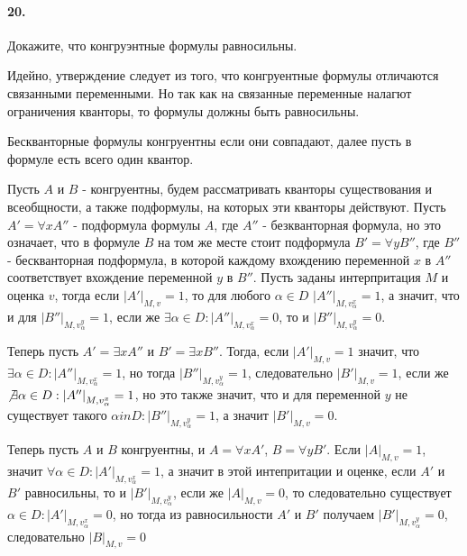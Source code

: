 \documentclass[a4paper,12pt]{article}
\begin{document}
\paragraph{20.} Докажите, что конгруэнтные формулы равносильны.

\begin{Solution}
Идейно, утверждение следует из того, что конгруентные формулы отличаются связанными переменными. Но так как на связанные переменные налагют ограничения кванторы, то формулы должны быть равносильны.

Бескванторные формулы конгруентны если они совпадают, далее пусть в формуле есть всего один квантор.

Пусть $A$ и $B$ - конгруентны, будем рассматривать кванторы существования и всеобщности, а также подформулы, на которых эти кванторы действуют. Пусть $A' = \forall x A''$ - подформула формулы $A$, где $A''$ - безкванторная формула, но это означает, что в формуле $B$ на том же месте стоит подформула $B' = \forall y B''$, где $B''$ - бескванторная подформула, в которой каждому вхождению переменной $x$ в $A''$ соответствует вхождение переменной $y$ в $B''$. Пусть заданы интерпритация $M$ и оценка $v$, тогда если $\left|A'\right|_{M, v} = 1$, то для любого $\alpha \in D$ $\left|A''\right|_{M, v^{x}_{\alpha}} = 1$, а значит, что и для $\left|B''\right|_{M, v^{y}_{\alpha}} = 1$, если же $\exists \alpha \in D : \left|A''\right|_{M, v^{x}_{\alpha}} = 0$, то и $\left|B''\right|_{M, v^{y}_{\alpha}} = 0$.

Теперь пусть $A' = \exists x A''$ и $B' = \exists x B''$. Тогда, если $\left|A'\right|_{M,v} = 1$ значит, что $\exists \alpha \in D : \left|A''\right|_{M, v^{x}_{\alpha}} = 1$, но тогда $\left|B''\right|_{M, v^{y}_{\alpha}} = 1$, следовательно $\left|B'\right|_{M, v} = 1$, если же $\not\exists \alpha \in D : \left|A''\right|_{M, v^{x}_{\alpha}} = 1$, но это также значит, что и для переменной $y$ не существует такого $\alpha in D : \left|B''\right|_{M,v^{y}_{\alpha}} = 1$, а значит $\left|B'\right|_{M,v} = 0$.

Теперь пусть $A$ и $B$ конгруентны, и $A = \forall x A'$, $B = \forall y B'$. Если $\left|A\right|_{M, v} = 1$, значит $\forall \alpha \in D : \left|A'\right|_{M,v_{\alpha}^x} = 1$, а значит в этой интепритации и оценке, если $A'$ и $B'$ равносильны, то и $\left|B'\right|_{M,v_{\alpha}^y}$, если же $\left|A\right|_{M,v} = 0$, то следовательно существует $\alpha \in D : \left|A'\right|_{M,v_{\alpha}^x} = 0$, но тогда из равносильности $A'$ и $B'$ получаем $\left|B'\right|_{M,v_{\alpha}^y} = 0$, следовательно $\left|B\right|_{M, v} = 0$
\end{Solution}
\end{document}
